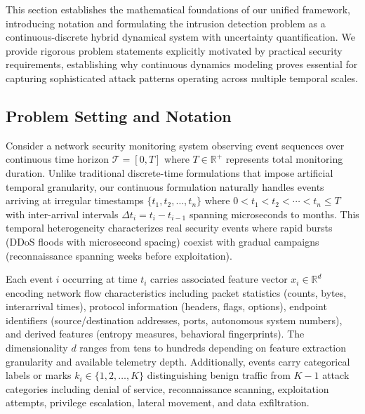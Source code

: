 \documentclass[10pt,journal,compsoc]{IEEEtran}
\newcommand{\R}{\mathbb{R}}
\newcommand{\Tcal}{\mathcal{T}}
\begin{document}
This section establishes the mathematical foundations of our unified framework, introducing notation and formulating the intrusion detection problem as a continuous-discrete hybrid dynamical system with uncertainty quantification. We provide rigorous problem statements explicitly motivated by practical security requirements, establishing why continuous dynamics modeling proves essential for capturing sophisticated attack patterns operating across multiple temporal scales.

\subsection{Problem Setting and Notation}

Consider a network security monitoring system observing event sequences over continuous time horizon $\Tcal = [0, T]$ where $T \in \R^+$ represents total monitoring duration. Unlike traditional discrete-time formulations that impose artificial temporal granularity, our continuous formulation naturally handles events arriving at irregular timestamps $\{t_1, t_2, \ldots, t_n\}$ where $0 < t_1 < t_2 < \cdots < t_n \leq T$ with inter-arrival intervals $\Delta t_i = t_i - t_{i-1}$ spanning microseconds to months. This temporal heterogeneity characterizes real security events where rapid bursts (DDoS floods with microsecond spacing) coexist with gradual campaigns (reconnaissance spanning weeks before exploitation).

Each event $i$ occurring at time $t_i$ carries associated feature vector $x_i \in \R^d$ encoding network flow characteristics including packet statistics (counts, bytes, interarrival times), protocol information (headers, flags, options), endpoint identifiers (source/destination addresses, ports, autonomous system numbers), and derived features (entropy measures, behavioral fingerprints). The dimensionality $d$ ranges from tens to hundreds depending on feature extraction granularity and available telemetry depth. Additionally, events carry categorical labels or marks $k_i \in \{1, 2, \ldots, K\}$ distinguishing benign traffic from $K-1$ attack categories including denial of service, reconnaissance scanning, exploitation attempts, privilege escalation, lateral movement, and data exfiltration.
\end{document}
